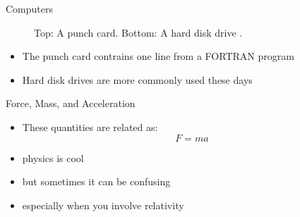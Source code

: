 \documentclass[final]{beamer}
\begin{document}
\begin{frame}{}
\begin{columns}[t]
\begin{column}{.3\linewidth}
\begin{block}{\large Computers}
\begin{figure}[h!]
			\caption{Top: A punch card. Bottom: A hard disk drive \cite{wiki:comp}.}
			\end{figure}
			\begin{itemize}
			\item{The punch card contrains one line from a FORTRAN program \cite{wiki:comp}}
			\item{Hard disk drives are more commonly used these days}
			\end{itemize}
    			\end{block}
    	\vfill
        	\begin{block}{\large Force, Mass, and Acceleration}
		\begin{itemize}
		\item{These quantities are related as:}
			\begin{equation*}
			F = ma
			\end{equation*}
		\item{physics is cool}
		\item{but sometimes it can be confusing}
		\item{especially when you involve relativity}
		\end{itemize}
        	\end{block}
    	\end{column}



\end{columns}
\end{frame}
\end{document}
